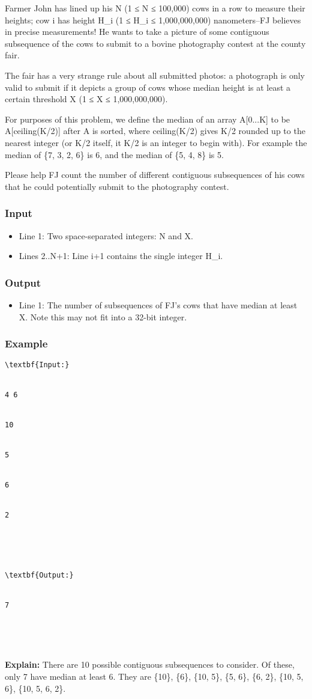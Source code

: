 



    Farmer John has lined up his N (1 ≤ N ≤ 100,000) cows in a row to measure their heights; cow i has height H\_i (1 ≤ H\_i ≤ 1,000,000,000) nanometers--FJ believes in precise measurements! He wants to take a picture of some contiguous subsequence of the cows to submit to a bovine photography contest at the county fair.   

    The fair has a very strange rule about all submitted photos: a photograph is only valid to submit if it depicts a group of cows whose median height is at least a certain threshold X (1 ≤ X ≤ 1,000,000,000).   

    For purposes of this problem, we define the median of an array A[0...K] to be A[ceiling(K/2)] after A is sorted, where ceiling(K/2) gives K/2 rounded  up to the nearest integer (or K/2 itself, it K/2 is an integer to begin with). For example the median of \{7, 3, 2, 6\} is 6, and the median of \{5, 4, 8\} is 5.   

    Please help FJ count the number of different contiguous subsequences of his cows that he could potentially submit to the photography contest.   

\subsubsection{   Input  }
\begin{itemize}
	\item      Line 1: Two space-separated integers: N and X.    
	\item      Lines 2..N+1: Line i+1 contains the single integer H\_i.    
\end{itemize}

\subsubsection{   Output  }
\begin{itemize}
	\item      Line 1: The number of subsequences of FJ's cows that have median at         least X. Note this may not fit into a 32-bit integer.    
\end{itemize}

\subsubsection{   Example  }
\begin{verbatim}
\textbf{Input:}


4 6 


10 


5 


6 


2 





\textbf{Output:}


7 





\end{verbatim}

\textbf{     Explain:    }    There are 10 possible contiguous subsequences to consider. Of these, only 7 have median at least 6. They are \{10\}, \{6\}, \{10, 5\}, \{5, 6\}, \{6, 2\}, \{10, 5, 6\}, \{10, 5, 6, 2\}.   
